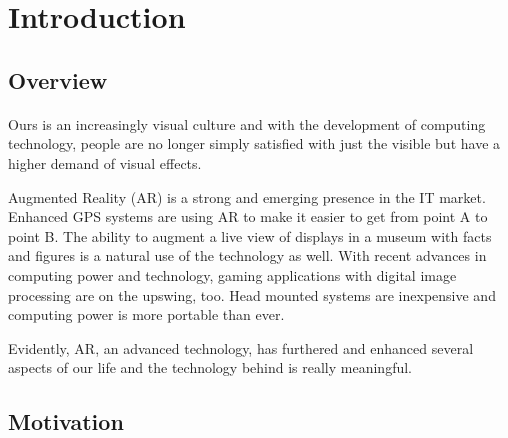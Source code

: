 \section{Introduction}
\label{sec:Introduction}

\subsection{Overview} 
\paragraph{}
Ours is an increasingly visual culture and with the development of computing technology, people are no longer simply satisfied with just the visible but have a higher demand of visual effects.
\par Augmented Reality (AR) is a strong and emerging presence in the IT market. Enhanced GPS systems are using AR to make it easier to get from point A to point B. The ability to augment a live view of displays in a museum with facts and figures is a natural use of the technology as well. With recent advances in computing power and technology, gaming applications with digital image processing are on the upswing, too. Head mounted systems are inexpensive and computing power is more portable than ever. 
\par Evidently, AR, an advanced technology, has furthered and enhanced several aspects of our life and the technology behind is really meaningful.

\subsection{Motivation}
